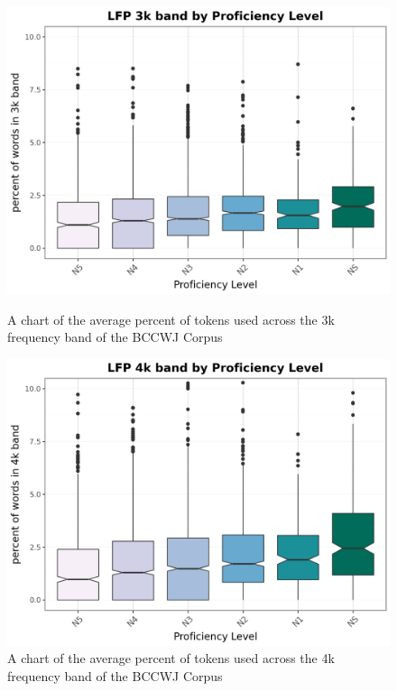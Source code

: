 \begin{figure}[htbp]
    \centering
    \begin{minipage}{.48\textwidth}
        \centering
    \includegraphics[scale=.4]{img/LFP/3k}
    \caption[Percentage of tokens used from the BCCWJ Corpus 3k band]{A chart of the average percent of tokens used across the 3k frequency band of the BCCWJ Corpus}
        \label{fig:3kband}
    \end{minipage}
    \hfill
\begin{minipage}{.48\textwidth}
        \centering
        \includegraphics[scale=.4]{img/LFP/4k}
        \caption[Percentage of tokens used from the BCCWJ Corpus 4k band]{A chart of the average percent of tokens used across the 4k frequency band of the BCCWJ Corpus}
\label{fig:4kband}
\end{minipage}
    \end{figure}

